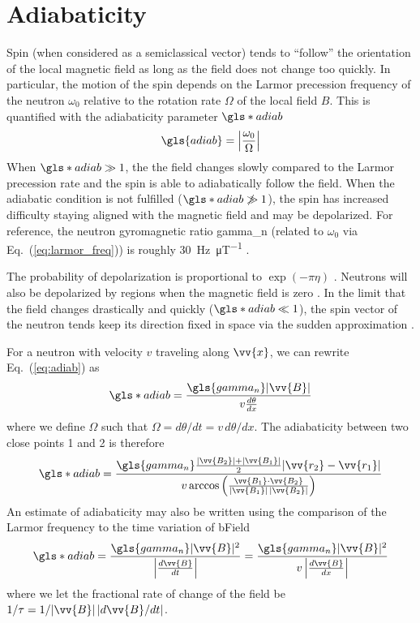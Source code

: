 
\section{Adiabaticity}\label{sec:adiabaticity}


Spin (when considered as a semiclassical vector) tends to ``follow'' the orientation of the local magnetic field as long as the field does not change too quickly. In particular, the motion of the spin depends on the Larmor precession frequency of the neutron $\omega_0$ relative to the rotation rate $\Omega$ of the local field $B$. This is quantified with the adiabaticity parameter $\gls*{adiab}$ \cite{abragam1961principles}
%
\begin{gather}
    \gls{adiab}=\left| \frac{\omega_0}{\Omega} \right| \label{eq:adiab}
\end{gather}
%
When $\gls*{adiab}\gg 1$, the the field changes slowly compared to the Larmor precession rate and the spin is able to adiabatically follow the field. When the adiabatic condition is not fulfilled ($\gls*{adiab}\not\gg 1$), the spin has increased difficulty staying aligned with the magnetic field and may be depolarized. For reference, the neutron gyromagnetic ratio \gls{gamma_n} (related to $\omega_0$ via Eq.~(\ref{eq:larmor_freq})) is roughly \qty{30}{\hertz.\micro\tesla^{-1}} \cite{codata_2018}.

The probability of depolarization is proportional to $\exp(-\pi\eta)$ \cite{golubUCN}. Neutrons will also be depolarized by regions when the magnetic field is zero \cite{Majorana1932}. In the limit that the field changes drastically and quickly ($\gls*{adiab}\ll 1$), the spin vector of the neutron tends keep its direction fixed in space via the sudden approximation \cite{rabi_1936_space_quant}.

For a neutron with velocity $v$ traveling along $\vv{x}$, we can rewrite Eq.~(\ref{eq:adiab}) as
%
\begin{gather}
    \gls*{adiab}=\frac{ \gls{gamma_n}| \vv{B} |}{v\frac{d\theta}{dx}}
\end{gather}
%
where we define $\Omega$ such that $\Omega=d\theta/dt=v\,d\theta/dx$. The adiabaticity between two close points 1 and 2 is therefore
%
\begin{gather}
    \gls*{adiab}=\frac{\gls{gamma_n} \frac{ | \vv{B_2} | +| \vv{B_1}| }{2} | \vv{r_2} - \vv{r_1}|}
    {v\arccos \left( \frac{\vv{B_1}\cdot\vv{B_2}}{| \vv{B_1} | \, \vert \vv{B_2} | }\right)}
\end{gather}
%
An estimate of adiabaticity may also be written using the comparison of the Larmor frequency to the time variation of \gls*{bField}
%
\begin{gather}
    \gls*{adiab}=\frac{\gls{gamma_n}| \vv{B} | ^2}{\left| \frac{d\vv{B}}{dt} \right|}
    =\frac{\gls{gamma_n}| \vv{B} | ^2}{v\left| \frac{d\vv{B}}{dx} \right|}
\end{gather}
%
where we let the fractional rate of change of the field be $1/\tau = 1/ |\vv{B}|\,|d\vv{B}/dt|$.

